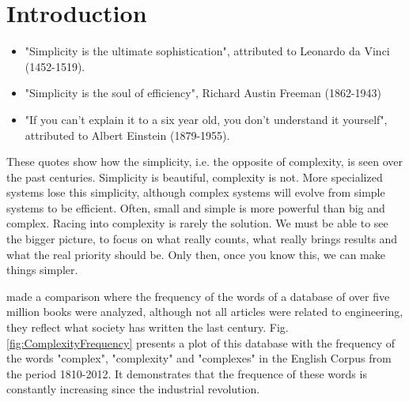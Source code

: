 \section{Introduction}
\begin{itemize}
\item "Simplicity is the ultimate sophistication", attributed to Leonardo da Vinci (1452-1519).
\item "Simplicity is the soul of efficiency", Richard Austin Freeman (1862-1943)
\item "If you can't explain it to a six year old, you don't understand it yourself", attributed to Albert Einstein (1879-1955).
\end{itemize}

These quotes show how the simplicity, i.e. the opposite of complexity, is seen over the past centuries. Simplicity is beautiful, complexity is not. 
More specialized systems lose this simplicity, although complex systems will evolve from simple systems to be efficient.
Often, small and simple is more powerful than big and complex. Racing into complexity is rarely the solution. We must be able to see the bigger picture, to focus on what really counts, what really brings results and what the real priority should be. Only then, once you know this, we can make things simpler.

\cite{Davies10} made a comparison where the frequency of the words of a database of over five million books were analyzed, although not all articles were related to engineering, they reflect what society has written the last century. Fig. \ref{fig:ComplexityFrequency} presents a plot of this database with the frequency of the words "complex", "complexity" and "complexes" in the English Corpus from the period 1810-2012. It demonstrates that the frequence of these words is constantly increasing since the industrial revolution.
